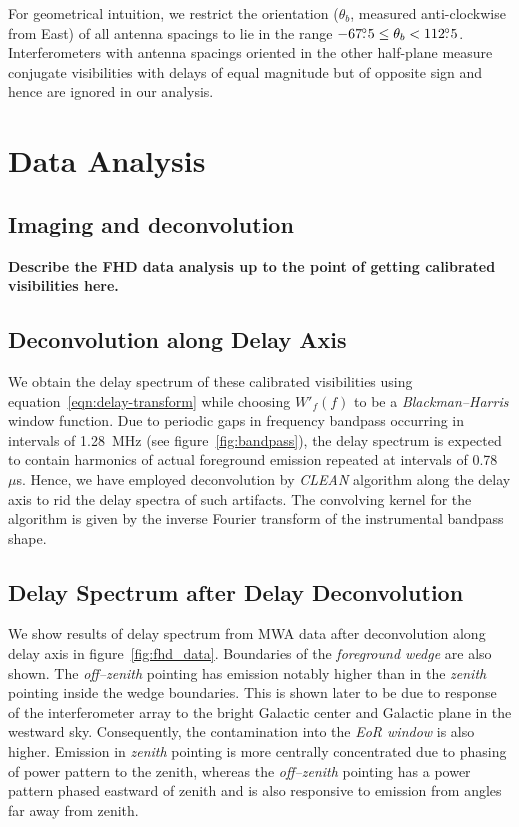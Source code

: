 \documentclass[preprint2,iop,numberedappendix]{emulateapj}
\begin{document}
For geometrical intuition, we restrict the orientation ($\theta_b$, measured anti-clockwise from East) of all antenna spacings to lie in the range $-67\mbox{$.\!\!^\circ$} 5 \leq \theta_b < 112\mbox{$.\!\!^\circ$} 5$. Interferometers with antenna spacings oriented in the other half-plane measure conjugate visibilities with delays of equal magnitude but of opposite sign and hence are ignored in our analysis.

\section{Data Analysis}\label{sec:data-analysis}

\subsection{Imaging and deconvolution}\label{sec:FHD}

{\bf Describe the FHD data analysis up to the point of getting calibrated visibilities here.}

\subsection{Deconvolution along Delay Axis}\label{sec:CLEAN}

We obtain the delay spectrum of these calibrated visibilities using equation~\ref{eqn:delay-transform} while choosing $W'_f(f)$ to be a {\it Blackman--Harris} window function. Due to periodic gaps in frequency bandpass occurring in intervals of 1.28~MHz (see figure~\ref{fig:bandpass}), the delay spectrum is expected to contain harmonics of actual foreground emission repeated at intervals of 0.78~$\mu$s. Hence, we have employed deconvolution by {\it CLEAN} algorithm \citep{tay99} along the delay axis \citep{par09,par12} to rid the delay spectra of such artifacts. The convolving kernel for the algorithm is given by the inverse Fourier transform of the instrumental bandpass shape. 

\subsection{Delay Spectrum after Delay Deconvolution}\label{sec:data-delay-spectrum}

We show results of delay spectrum from MWA data after deconvolution along delay axis in figure~\ref{fig:fhd_data}. Boundaries of the {\it foreground wedge} are also shown. The {\it off--zenith} pointing has emission notably higher than in the {\it zenith} pointing inside the wedge boundaries. This is shown later to be due to response of the interferometer array to the bright Galactic center and Galactic plane in the westward sky. Consequently, the contamination into the {\it EoR window} is also higher. Emission in {\it zenith} pointing is more centrally concentrated due to phasing of power pattern to the zenith, whereas the {\it off--zenith} pointing has a power pattern phased eastward of zenith and is also responsive to emission from angles far away from zenith. 
\end{document}
